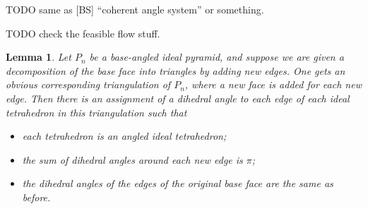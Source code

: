 \documentclass[11pt]{amsart}
\theoremstyle{plain}
\newtheorem{lemma}[theorem]{Lemma}
\theoremstyle{definition}
\begin{document}
TODO same as [BS] ``coherent angle system'' or something.


TODO check the feasible flow stuff.


\begin{lemma}
\label{l:pyramid_decomp}
Let $P_n$ be a base-angled ideal pyramid, and suppose we are given a
decomposition of the base face into triangles by adding new edges.  One gets an
obvious corresponding triangulation of $P_n$, where a new face is added for each
new edge. Then there is an assignment of a dihedral angle to each edge of each
ideal tetrahedron in this triangulation such that
\begin{itemize}
\item each tetrahedron is an angled ideal tetrahedron;
\item the sum of dihedral angles around each new edge is $\pi$;
\item the dihedral angles of the edges of the original base face are the same as
	before.
\end{itemize} 
\end{lemma}
\end{document}
